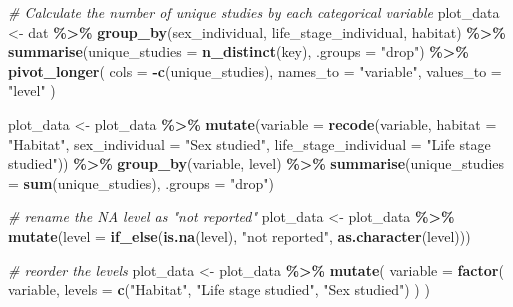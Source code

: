 \documentclass[
]{article}
\newenvironment{Shaded}{\begin{snugshade}}{\end{snugshade}}
\newcommand{\AttributeTok}[1]{\textcolor[rgb]{0.13,0.29,0.53}{#1}}
\newcommand{\CommentTok}[1]{\textcolor[rgb]{0.56,0.35,0.01}{\textit{#1}}}
\newcommand{\FunctionTok}[1]{\textcolor[rgb]{0.13,0.29,0.53}{\textbf{#1}}}
\newcommand{\NormalTok}[1]{#1}
\newcommand{\OtherTok}[1]{\textcolor[rgb]{0.56,0.35,0.01}{#1}}
\newcommand{\SpecialCharTok}[1]{\textcolor[rgb]{0.81,0.36,0.00}{\textbf{#1}}}
\newcommand{\StringTok}[1]{\textcolor[rgb]{0.31,0.60,0.02}{#1}}
\begin{document}
\begin{Shaded}
\begin{Highlighting}[]
\CommentTok{\# Calculate the number of unique studies by each categorical variable}
\NormalTok{plot\_data }\OtherTok{\textless{}{-}}\NormalTok{ dat }\SpecialCharTok{\%\textgreater{}\%}
  \FunctionTok{group\_by}\NormalTok{(sex\_individual, life\_stage\_individual, habitat) }\SpecialCharTok{\%\textgreater{}\%}
  \FunctionTok{summarise}\NormalTok{(}\AttributeTok{unique\_studies =} \FunctionTok{n\_distinct}\NormalTok{(key), }\AttributeTok{.groups =} \StringTok{"drop"}\NormalTok{) }\SpecialCharTok{\%\textgreater{}\%}
  \FunctionTok{pivot\_longer}\NormalTok{(}
    \AttributeTok{cols =} \SpecialCharTok{{-}}\FunctionTok{c}\NormalTok{(unique\_studies),}
    \AttributeTok{names\_to =} \StringTok{"variable"}\NormalTok{,}
    \AttributeTok{values\_to =} \StringTok{"level"}
\NormalTok{  )}

\NormalTok{plot\_data }\OtherTok{\textless{}{-}}\NormalTok{ plot\_data }\SpecialCharTok{\%\textgreater{}\%}
  \FunctionTok{mutate}\NormalTok{(}\AttributeTok{variable =} \FunctionTok{recode}\NormalTok{(variable,}
                           \AttributeTok{habitat =} \StringTok{"Habitat"}\NormalTok{,}
                           \AttributeTok{sex\_individual =} \StringTok{"Sex studied"}\NormalTok{,}
                           \AttributeTok{life\_stage\_individual =} \StringTok{"Life stage studied"}\NormalTok{)) }\SpecialCharTok{\%\textgreater{}\%}
  \FunctionTok{group\_by}\NormalTok{(variable, level) }\SpecialCharTok{\%\textgreater{}\%}
  \FunctionTok{summarise}\NormalTok{(}\AttributeTok{unique\_studies =} \FunctionTok{sum}\NormalTok{(unique\_studies), }\AttributeTok{.groups =} \StringTok{"drop"}\NormalTok{)}

\CommentTok{\# rename the NA level as "not reported"}
\NormalTok{plot\_data }\OtherTok{\textless{}{-}}\NormalTok{ plot\_data }\SpecialCharTok{\%\textgreater{}\%}
  \FunctionTok{mutate}\NormalTok{(}\AttributeTok{level =} \FunctionTok{if\_else}\NormalTok{(}\FunctionTok{is.na}\NormalTok{(level), }\StringTok{"not reported"}\NormalTok{, }\FunctionTok{as.character}\NormalTok{(level)))}

\CommentTok{\#  reorder the levels}
\NormalTok{plot\_data }\OtherTok{\textless{}{-}}\NormalTok{ plot\_data }\SpecialCharTok{\%\textgreater{}\%}
  \FunctionTok{mutate}\NormalTok{(}
    \AttributeTok{variable =} \FunctionTok{factor}\NormalTok{(}
\NormalTok{      variable,}
      \AttributeTok{levels =} \FunctionTok{c}\NormalTok{(}\StringTok{"Habitat"}\NormalTok{, }\StringTok{"Life stage studied"}\NormalTok{, }\StringTok{"Sex studied"}\NormalTok{)}
\NormalTok{    )}
\NormalTok{  )}


\end{Highlighting}
\end{Shaded}
\end{document}
